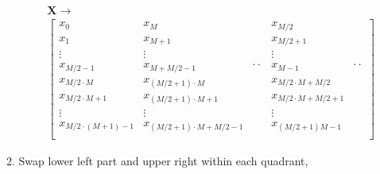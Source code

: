 \begin{equation*}
    \begin{aligned}
    \label{eq:matrix_trans_step_1}
    &\bm{X} \rightarrow \\
    &\left[\begin{array}{c|c|c|c|c}
        x_0 & x_M & & x_{M/2} &  \\ 
        x_1 & x_{M+1} & & x_{M/2+1} & \\
        \vdots & \vdots & & \vdots & \\
        x_{M/2-1} & x_{M+M/2-1} & \cdot\cdot & x_{M-1} & \cdot\cdot \\
        x_{M/2\cdot M} & x_{(M/2+1)\cdot M} & & x_{M/2\cdot M+M/2} & \\
        x_{M/2\cdot M+1} & x_{(M/2+1)\cdot M+1} & & x_{M/2\cdot M+M/2+1} & \\
        \vdots & \vdots & & \vdots & \\
        x_{M/2\cdot (M+1)-1} & x_{(M/2+1)\cdot M+M/2-1} & & x_{(M/2+1)M-1} & \\
        \end{array}\right]
    \end{aligned}
\end{equation*}

2. Swap lower left part and upper right within each quadrant,

